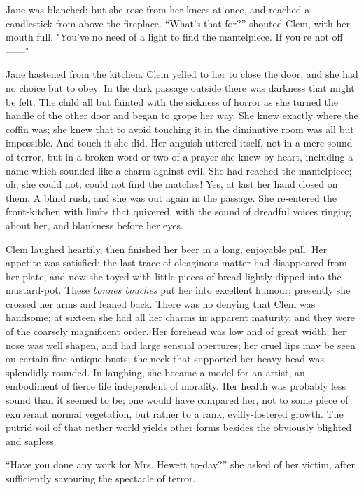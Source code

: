 Jane was blanched; but she rose from her knees at once, and reached a
candlestick from above the fireplace. ``What's that for?'' shouted Clem,
with her mouth full. "You've no need of a light to find the mantelpiece.
If you're not off{{------}}"

Jane hastened from the kitchen. Clem yelled to her to close the door,
and she had no choice but to obey. In the dark passage outside there was
darkness that might be felt. The child all but fainted with the
{\protect\hypertarget{17}{}{}}sickness of horror as she turned the
handle of the other door and began to grope her way. She knew exactly
where the coffin was; she knew that to avoid touching it in the
diminutive room was all but impossible. And touch it she did. Her
anguish uttered itself, not in a mere sound of terror, but in a broken
word or two of a prayer she knew by heart, including a name which
sounded like a charm against evil. She had reached the mantelpiece; oh,
she could not, could not find the matches! Yes, at last her hand closed
on them. A blind rush, and she was out again in the passage. She
re-entered the front-kitchen with limbs that quivered, with the sound of
dreadful voices ringing about her, and blankness before her eyes.

Clem laughed heartily, then finished her beer in a long, enjoyable pull.
Her appetite was satisfied; the last trace of oleaginous matter had
disappeared from her plate, and now she toyed with little pieces of
bread lightly dipped into the mustard-pot. These
{\protect\hypertarget{18}{}{}}\emph{bonnes bouches} put her into
excellent humour; presently she crossed her arms and leaned back. There
was no denying that Clem was handsome; at sixteen she had all her charms
in apparent maturity, and they were of the coarsely magnificent order.
Her forehead was low and of great width; her nose was well shapen, and
had large sensual apertures; her cruel lips may be seen on certain fine
antique busts; the neck that supported her heavy head was splendidly
rounded. In laughing, she became a model for an artist, an embodiment of
fierce life independent of morality. Her health was probably less sound
than it seemed to be; one would have compared her, not to some piece of
exuberant normal vegetation, but rather to a rank, evilly-fostered
growth. The putrid soil of that nether world yields other forms besides
the obviously blighted and sapless.

``Have you done any work for Mrs. Hewett to-day?'' she asked of her
victim, after sufficiently savouring the spectacle of terror.

